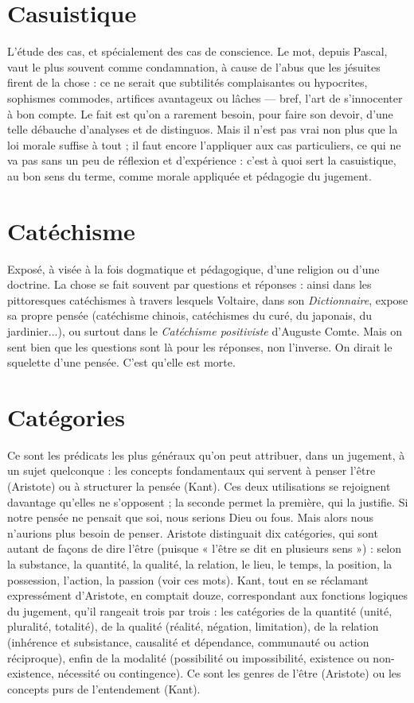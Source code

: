 \section{Casuistique}
L'étude des cas, et spécialement des cas de conscience. Le
mot, depuis Pascal, vaut le plus souvent comme condamnation,
à cause de l’abus que les jésuites firent de la chose : ce ne serait que subtilités
complaisantes ou hypocrites, sophismes commodes, artifices avantageux
ou lâches — bref, l’art de s’innocenter à bon compte. Le fait est qu’on a rarement
besoin, pour faire son devoir, d’une telle débauche d’analyses et de distinguos.
Mais il n’est pas vrai non plus que la loi morale suffise à tout ; il faut
encore l’appliquer aux cas particuliers, ce qui ne va pas sans un peu de réflexion
et d'expérience : c’est à quoi sert la casuistique, au bon sens du terme, comme
morale appliquée et pédagogie du jugement.

\section{Catéchisme}
Exposé, à visée à la fois dogmatique et pédagogique, d’une
religion ou d’une doctrine. La chose se fait souvent par questions
et réponses : ainsi dans les pittoresques catéchismes à travers lesquels Voltaire,
dans son {\it Dictionnaire}, expose sa propre pensée (catéchisme chinois, catéchismes
du curé, du japonais, du jardinier...), ou surtout dans le {\it Catéchisme
positiviste} d’Auguste Comte. Mais on sent bien que les questions sont là pour
les réponses, non l'inverse. On dirait le squelette d’une pensée. C’est qu’elle est
morte.

\section{Catégories}
Ce sont les prédicats les plus généraux qu’on peut attribuer,
dans un jugement, à un sujet quelconque : les concepts fondamentaux
qui servent à penser l’être (Aristote) ou à structurer la pensée
(Kant). Ces deux utilisations se rejoignent davantage qu’elles ne s’opposent ; la
seconde permet la première, qui la justifie. Si notre pensée ne pensait que soi,
nous serions Dieu ou fous. Mais alors nous n’aurions plus besoin de penser.
Aristote distinguait dix catégories, qui sont autant de façons de dire l’être
(puisque « l'être se dit en plusieurs sens ») : selon la substance, la quantité, la
qualité, la relation, le lieu, le temps, la position, la possession, l’action, la passion
(voir ces mots). Kant, tout en se réclamant expressément d’Aristote, en
comptait douze, correspondant aux fonctions logiques du jugement, qu’il rangeait
trois par trois : les catégories de la quantité (unité, pluralité, totalité), de
la qualité (réalité, négation, limitation), de la relation (inhérence et subsistance,
causalité et dépendance, communauté ou action réciproque), enfin de la modalité
(possibilité ou impossibilité, existence ou non-existence, nécessité ou
contingence). Ce sont les genres de l’être (Aristote) ou les concepts purs de
l’entendement (Kant).

